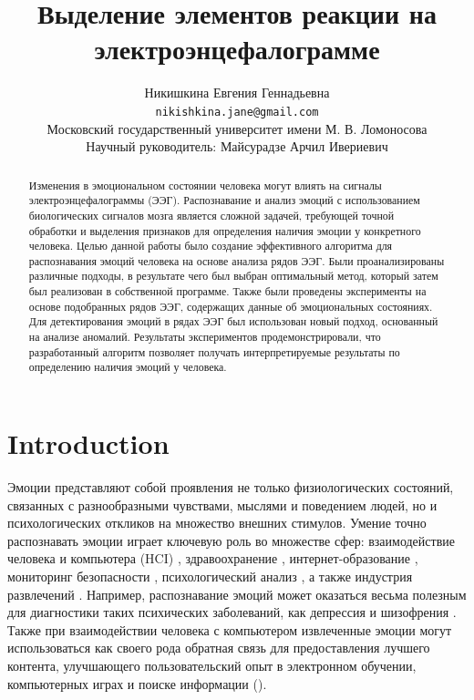 \documentclass{article}
\title{Выделение элементов реакции на электроэнцефалограмме}
\author{ Никишкина Евгения Геннадьевна \\
        \texttt{nikishkina.jane@gmail.com} \\
	Московский государственный университет имени М. В. Ломоносова\\
    Научный руководитель: Майсурадзе Арчил Ивериевич \\
	} \\
\date{}
\begin{document}
\maketitle

\begin{abstract}
	Изменения в эмоциональном состоянии человека могут влиять на сигналы электроэнцефалограммы (ЭЭГ). Распознавание и анализ эмоций с использованием биологических сигналов мозга является сложной задачей, требующей точной обработки и выделения признаков для определения наличия эмоции у конкретного человека. Целью данной работы было создание эффективного алгоритма для распознавания эмоций человека на основе анализа рядов ЭЭГ. Были проанализированы различные подходы, в результате чего был выбран оптимальный метод, который затем был реализован в собственной программе. Также были проведены эксперименты на основе подобранных рядов ЭЭГ, содержащих данные об эмоциональных состояниях. Для детектирования эмоций в рядах ЭЭГ был использован новый подход, основанный на анализе аномалий. Результаты экспериментов продемонстрировали, что разработанный алгоритм позволяет получать интерпретируемые результаты по определению наличия эмоций у человека.
\end{abstract}



\section{Introduction}
Эмоции представляют собой проявления не только физиологических состояний, связанных с разнообразными чувствами, мыслями и поведением людей, но и психологических откликов на множество внешних стимулов. Умение точно распознавать эмоции играет ключевую роль во множестве сфер: взаимодействие человека и компьютера (HCI) \citep{HCI}, здравоохранение \citep{healtcare}, интернет-образование \citep{inted}, мониторинг безопасности \citep{security}, психологический анализ \citep{psych}, а также индустрия развлечений \citep{entern}. Например, распознавание эмоций может оказаться весьма полезным для диагностики таких психических заболеваний, как депрессия и шизофрения \citep{schizophrenia}. Также при взаимодействии человека с компьютером извлеченные эмоции могут использоваться как своего рода обратная связь для предоставления лучшего контента, улучшающего пользовательский опыт в электронном обучении, компьютерных играх и поиске информации (\citep{HCI}).
\end{document}
